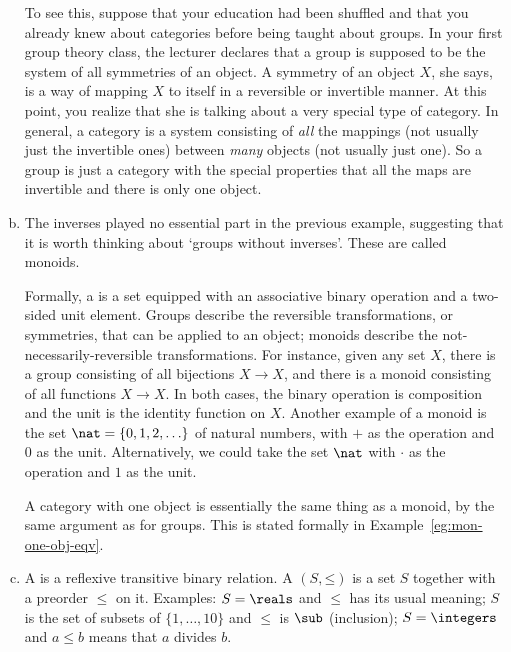 \begin{examples}
\begin{enumerate}[(b)]
To see this, suppose that your education had been shuffled and that you
already knew about categories before being taught about groups.  In your
first group theory class, the lecturer declares that a group is supposed to
be the system of all symmetries of an object.  A symmetry of an object $X$,
she says, is a way of mapping $X$ to itself in a reversible or invertible
manner.  At this point, you realize that she is talking about a very
special type of category.  In general, a category is a system consisting of
\emph{all} the mappings (not usually just the invertible ones) between
\emph{many} objects (not usually just one).  So a group is just a category
with the special properties that all the maps are invertible and there is
only one object.

\item   
\label{eg:cats-as:monoids}
The inverses played no essential part in the previous example, suggesting that
it is worth thinking about `groups without inverses'.  These are called
monoids.  

Formally, a %
%
%
is a set equipped with an associative binary operation and a two-sided unit
element.  Groups describe the reversible transformations, or symmetries,
that can be applied to an object; monoids describe the
not-necessarily-reversible transformations.  For instance, given any set
$X$, there is a group consisting of all bijections $X \to X$, and there is
a monoid consisting of all functions $X \to X$.  In both cases, the binary
operation is composition and the unit is the identity function on $X$.
Another example of a monoid is the set $\nat = \{0, 1, 2, \ldots\}$%
%
%
of natural%
%
%
numbers, with $+$ as the operation and $0$ as the unit.  Alternatively, we
could take the set $\nat$ with $\cdot$ as the operation and $1$ as the
unit.

A category with one%
%
%
object is essentially the same thing as a monoid, by the same argument as
for groups.  This is stated formally in Example~\ref{eg:mon-one-obj-eqv}.%
%
%

\item   
\label{eg:cats-as:orders}
A %
%
%
is a reflexive transitive binary relation.  A  $(S,
\mathord{\leq})$%
%
%
is a set $S$ together with a preorder $\leq$ on it.  Examples: $S = \reals$
and $\leq$ has its usual meaning; $S$ is the set of subsets of $\{1,
\ldots, 10\}$ and $\leq$ is $\sub$ (inclusion); $S = \integers$ and $a \leq
b$ means that $a$ divides $b$.


\end{enumerate}
\end{examples}
